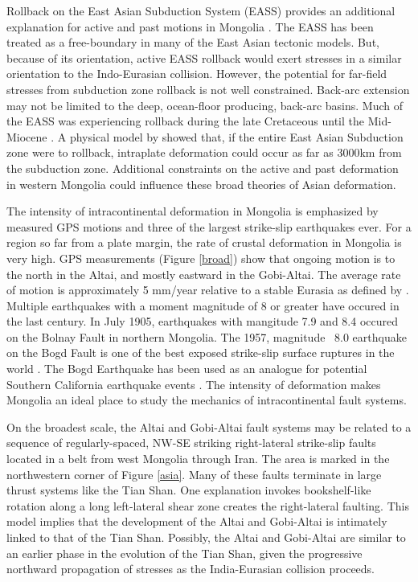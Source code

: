 	Rollback on the East Asian Subduction System (EASS) provides an additional explanation for active and past motions in Mongolia \citep{Schellart2005}. The EASS has been treated as a free-boundary in many of the East Asian tectonic models\citep{Tapponnier1982}\citep{Peltzer1996}\citep{Houseman1993}. But, because of its orientation, active EASS rollback would exert stresses in a similar orientation to the Indo-Eurasian collision. However, the potential for far-field stresses from subduction zone rollback is not well constrained. Back-arc extension may not be limited to the deep, ocean-floor producing, back-arc basins. Much of the EASS was experiencing rollback during the late Cretaceous until the Mid-Miocene \citep{Northrup1995}\citep{Schellart2005a}. A physical model by \citet{Schellart2005} showed that, if the entire East Asian Subduction zone were to rollback, intraplate deformation could occur as far as 3000km from the subduction zone. Additional constraints on the active and past deformation in western Mongolia could influence these broad theories of Asian deformation.

	 The intensity of intracontinental deformation in Mongolia is emphasized by measured GPS motions and three of the largest strike-slip earthquakes ever. For a region so far from a plate margin, the rate of crustal deformation in Mongolia is very high. GPS measurements (Figure \ref{broad}) show that ongoing motion is to the north in the Altai, and mostly eastward in the Gobi-Altai\citep{Calais2003}. The average rate of motion is approximately 5 mm/year relative to a stable Eurasia as defined by \citet{Calais2003}. Multiple earthquakes with a moment magnitude of 8 or greater have occured in the last century. In July 1905, earthquakes with mangitude 7.9 and 8.4 occured on the Bolnay Fault in northern Mongolia. The 1957, magnitude ~8.0 earthquake on the Bogd Fault is one of the best exposed strike-slip surface ruptures in the world\citep{Kurushin1998} \citep{Okal1976a} \citep{Pollitz2003}. The Bogd Earthquake has been used as an analogue for potential Southern California earthquake events \citep{Bayarsayhan1996}.  The intensity of deformation makes Mongolia an ideal place to study the mechanics of intracontinental fault systems.
	
	On the broadest scale, the Altai and Gobi-Altai fault systems may be related to a sequence of regularly-spaced, NW-SE striking right-lateral strike-slip faults \citep{Yin2010} located in a belt from west Mongolia through Iran. The area is marked in the northwestern corner of Figure \ref{asia}. Many of these faults terminate in large thrust systems like the Tian Shan. One explanation invokes bookshelf-like rotation along a long left-lateral shear zone creates the right-lateral faulting. \citep{Davy1988}\citep{Bayasgalan2005a}  This model implies that the development of the Altai and Gobi-Altai is intimately linked to that of the Tian Shan. Possibly, the Altai and Gobi-Altai are similar to an earlier phase in the evolution of the Tian Shan, given the progressive northward propagation of stresses as the India-Eurasian collision proceeds.


